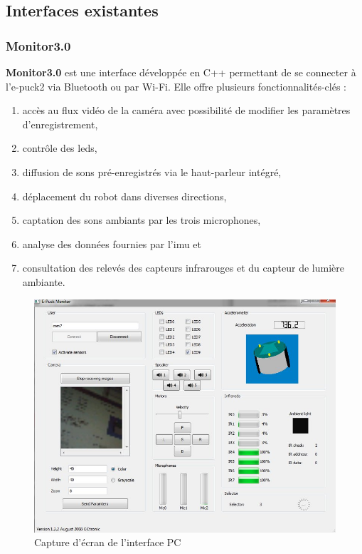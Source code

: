 \subsection{Interfaces existantes} \label{sec:interfaces_existantes}

\subsubsection{Monitor3.0}
\textbf{Monitor3.0} est une interface développée en C++ permettant de se connecter à l'e-puck2 via Bluetooth \autocite{noauthor_e-puck2monitor_2024} ou par Wi-Fi.
Elle offre plusieurs fonctionnalités-clés :
\begin{enumerate}
    \item accès au flux vidéo de la caméra avec possibilité de modifier les paramètres d'enregistrement,  
    \item contrôle des \acrshort{led}s,  
    \item diffusion de sons pré-enregistrés via le haut-parleur intégré,  
    \item déplacement du robot dans diverses directions,  
    \item captation des sons ambiants par les trois microphones,  
    \item analyse des données fournies par l'\acrshort{imu} et
    \item consultation des relevés des capteurs infrarouges et du capteur de lumière ambiante.  
\end{enumerate}

\begin{figure}[H]
    \centering
    \includegraphics[width=0.6\linewidth]{figures//Monitor3.0.png}
    \caption{Capture d'écran de l'interface PC \autocite{gctronic_e-puck2_nodate}}
    \label{fig:screenshot_monitor_interface}
\end{figure}

